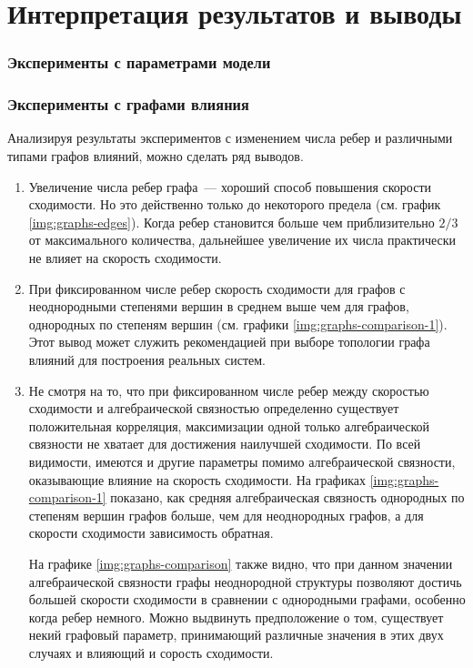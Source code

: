 \chapter{Интерпретация результатов и выводы} \label{analysis}

\subsection*{Эксперименты с параметрами модели}

\subsection*{Эксперименты с графами влияния}

Анализируя результаты экспериментов с изменением числа ребер и различными типами графов влияний, можно сделать ряд выводов. 

\begin{enumerate}
\item Увеличение числа ребер графа~--- хороший способ повышения скорости сходимости.  Но это действенно только до некоторого предела (см. график \ref{img:graphs-edges}). Когда ребер становится больше чем приблизительно $2/3$ от максимального количества, дальнейшее увеличение их числа практически не влияет на скорость сходимости.

\item При фиксированном числе ребер скорость сходимости для графов с неоднородными степенями вершин в среднем выше чем для графов, однородных по степеням вершин (см. графики \ref{img:graphs-comparison-1}). Этот вывод может служить рекомендацией при выборе топологии графа влияний для построения реальных систем.

\item Не смотря на то, что при фиксированном числе ребер между скоростью сходимости и алгебраической связностью определенно существует положительная корреляция, максимизации одной только алгебраической связности не хватает для достижения наилучшей сходимости. По всей видимости, имеются и другие параметры помимо алгебраической связности, оказывающие влияние на скорость сходимости. На графиках \ref{img:graphs-comparison-1} показано, как средняя алгебраическая связность однородных по степеням вершин графов больше, чем для неоднородных графов, а для скорости сходимости зависимость обратная. 

На графике \ref{img:graphs-comparison} также видно, что при данном значении алгебраической связности графы неоднородной структуры позволяют достичь б\emph{о}льшей скорости сходимости в сравнении с однородными графами, особенно когда ребер немного. Можно выдвинуть предположение о том, существует некий графовый параметр, принимающий различные значения в этих двух случаях и влияющий и сорость сходимости.
\end{enumerate}

\clearpage
